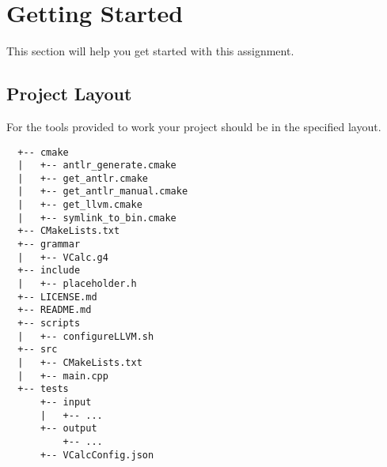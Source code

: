 \documentclass{article}
\begin{document}
\section{Getting Started}
This section will help you get started with this assignment.

\subsection{Project Layout}
For the tools provided to work your project should be in the specified layout.
\begin{lstlisting}
  +-- cmake
  |   +-- antlr_generate.cmake
  |   +-- get_antlr.cmake
  |   +-- get_antlr_manual.cmake
  |   +-- get_llvm.cmake
  |   +-- symlink_to_bin.cmake
  +-- CMakeLists.txt
  +-- grammar
  |   +-- VCalc.g4
  +-- include
  |   +-- placeholder.h
  +-- LICENSE.md
  +-- README.md
  +-- scripts
  |   +-- configureLLVM.sh
  +-- src
  |   +-- CMakeLists.txt
  |   +-- main.cpp
  +-- tests
      +-- input
      |   +-- ...
      +-- output
          +-- ...
      +-- VCalcConfig.json
\end{lstlisting}
\end{document}
